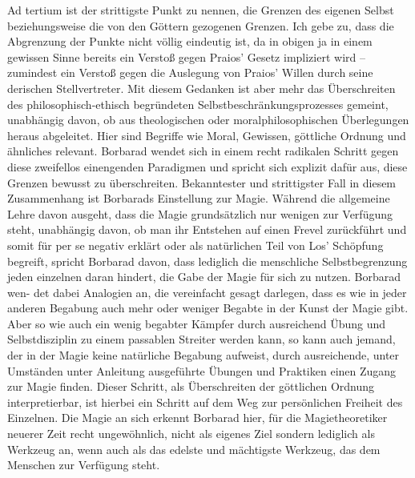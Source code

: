 \documentclass[11pt]{article}
\begin{document}
Ad tertium ist der strittigste Punkt zu nennen, die Grenzen des eigenen Selbst beziehungsweise die von
den Göttern gezogenen Grenzen. Ich gebe zu, dass die Abgrenzung der Punkte nicht völlig eindeutig ist,
da in obigen ja in einem gewissen Sinne bereits ein Verstoß gegen Praios' Gesetz impliziert wird – zumindest ein Verstoß gegen die Auslegung von Praios' Willen durch seine derischen Stellvertreter. Mit
diesem Gedanken ist aber mehr das Überschreiten des philosophisch-ethisch begründeten Selbstbeschränkungsprozesses gemeint, unabhängig davon, ob aus theologischen oder moralphilosophischen
Überlegungen heraus abgeleitet. Hier sind Begriffe wie Moral, Gewissen, göttliche Ordnung und ähnliches
relevant. Borbarad wendet sich in einem recht radikalen Schritt gegen diese zweifellos einengenden
Paradigmen und spricht sich explizit dafür aus, diese Grenzen bewusst zu überschreiten. Bekanntester
und strittigster Fall in diesem Zusammenhang ist Borbarads Einstellung zur Magie. Während die allgemeine Lehre davon ausgeht, dass die Magie grundsätzlich nur wenigen zur Verfügung steht, unabhängig
davon, ob man ihr Entstehen auf einen Frevel zurückführt und somit für per se negativ erklärt oder als
natürlichen Teil von Los' Schöpfung begreift, spricht Borbarad davon, dass lediglich die menschliche
Selbstbegrenzung jeden einzelnen daran hindert, die Gabe der Magie für sich zu nutzen. Borbarad wen-
det dabei Analogien an, die vereinfacht gesagt darlegen, dass es wie in jeder anderen Begabung auch
mehr oder weniger Begabte in der Kunst der Magie gibt. Aber so wie auch ein wenig begabter Kämpfer
durch ausreichend Übung und Selbstdisziplin zu einem passablen Streiter werden kann, so kann auch
jemand, der in der Magie keine natürliche Begabung aufweist, durch ausreichende, unter Umständen
unter Anleitung ausgeführte Übungen und Praktiken einen Zugang zur Magie finden. Dieser Schritt, als
Überschreiten der göttlichen Ordnung interpretierbar, ist hierbei ein Schritt auf dem Weg zur persönlichen Freiheit des Einzelnen. Die Magie an sich erkennt Borbarad hier, für die Magietheoretiker neuerer
Zeit recht ungewöhnlich, nicht als eigenes Ziel sondern lediglich als Werkzeug an, wenn auch als das
edelste und mächtigste Werkzeug, das dem Menschen zur Verfügung steht.
\end{document}
